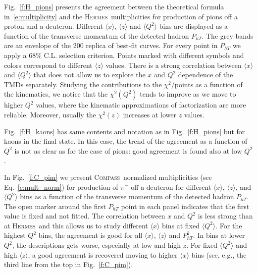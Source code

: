 \documentclass[aps,preprintnumbers,showpacs,nofootinbib,superscriptaddress,floatfix]{revtex4}
\newcommand{\AS}[1]{{\textcolor[rgb]{1,0,1}{#1}}}
\newcommand{\hermes}{\textsc{Hermes}}
\newcommand{\compass}{\textsc{Compass}}
\begin{document}
Fig.~\ref{f:H_pions} presents the agreement between the theoretical formula in~\eqref{e:multiplicity} and the \hermes\ multiplicities for production of pions off a proton and a deuteron. 
Different $\langle x \rangle$, $\langle z \rangle$ and $\langle Q^2 \rangle$
bins are displayed as a function 
of the transverse momentum of the detected hadron $P_{hT}$.
The grey bands are an envelope of the $200$ replica of best-fit curves. For every point in $P_{hT}$ we apply a $68\%$ C.L. selection criterion. 
Points marked with different symbols and colors correspond to different
$\langle z \rangle$ values. There is a strong correlation between $\langle x
\rangle$ and $\langle Q^2 \rangle$ that does not allow us to explore the $x$ and $Q^2$ dependence of the TMDs separately. 
Studying the contributions to the $\chi^2$/points as a function of the kinematics,  
we notice that the $\chi^2(Q^2)$ 
tends to improve as we move to higher $Q^2$ values, where the kinematic approximations of factorization are more reliable. 
Moreover, usually the $\chi^2(z)$ increases at lower $z$ values.

Fig.~\ref{f:H_kaons} has same contents and notation as in Fig.~\ref{f:H_pions}
but for kaons in the final state. In this case, the trend of the agreement as
a function of $Q^2$ is not as clear as for the case of pions: good agreement
is found also at low $Q^2$.

In Fig.~\ref{f:C_pim} we present \compass\ normalized multiplicities (see
Eq.~\eqref{e:mult_norm}) for production of $\pi^-$ off a deuteron for
different $\langle x \rangle$, $\langle z \rangle$, and $\langle Q^2 \rangle$
bins as a function of the transverse momentum of the detected hadron
$P_{hT}$. The open marker around the first $P_{hT}$ point in each panel indicates that the first value is fixed and not fitted. 
The correlation between $x$ and $Q^2$ is less strong than at \hermes\ and this
allows us to study different $\langle x \rangle$ bins at fixed $\langle Q^2 \rangle$.
For the highest $Q^2$ bins, the agreement is good for all $\langle x \rangle$, $\langle z \rangle$ and $P_{hT}^2$. 
In bins at lower $Q^2$, the descriptions gets worse, especially at low and
high $z$. 
For fixed $\langle Q^2 \rangle$ and high $\langle z \rangle$, a good agreement
is recovered moving to higher $\langle x \rangle$ bins (see, e.g., the
  third line from the top in Fig.~\ref{f:C_pim}).
\end{document}
